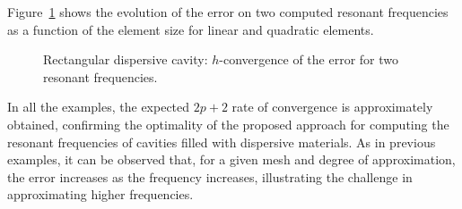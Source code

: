 Figure~\ref{fig:rectangle2Ddispersive_Convergence} shows the evolution of the error on two computed resonant frequencies as a function of the element size for linear and quadratic elements. 
\begin{figure}[!ht]
	\centering

	\caption{Rectangular dispersive cavity: $h$-convergence of the error for two resonant frequencies.}
	\label{fig:rectangle2Ddispersive_Convergence}
\end{figure}
In all the examples, the expected $2p+2$ rate of convergence is approximately obtained, confirming the optimality of the proposed approach for computing the resonant frequencies of cavities filled with dispersive materials. As in previous examples, it can be observed that, for a given mesh and degree of approximation, the error increases as the frequency increases, illustrating the challenge in approximating higher frequencies. 


